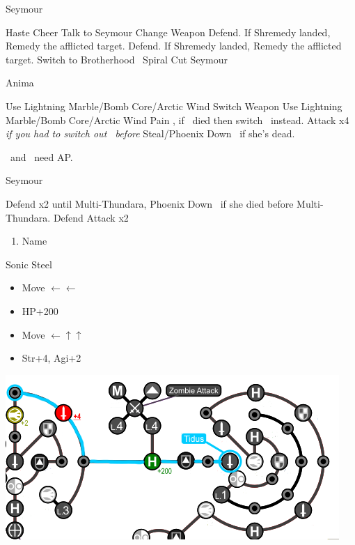 \begin{battle}[3000]{Seymour}
	\begin{itemize}
		\tidusf Haste \tidus
		\tidusf Cheer
		\tidusf Talk to Seymour
		\yunaf Change Weapon
		\switch{\kimahri}{\rikku}
		\rikkuf Defend. If Shremedy landed, Remedy the afflicted target.
		\switch{\yuna}{\kimahri}
		\kimahrif Defend. If Shremedy landed, Remedy the afflicted target.
		\tidusf Switch to Brotherhood
		\tidusf \od\ Spiral Cut Seymour
	\end{itemize}
\end{battle}
\vfill
\begin{battle}[18000]{Anima}
	\begin{itemize}
		\rikkuf Use Lightning Marble/Bomb Core/Arctic Wind
		\switch{\tidus}{\wakka}
		\wakkaf Switch Weapon
		\kimahrif Use Lightning Marble/Bomb Core/Arctic Wind
		\enemyf Pain
		\switch{\wakka}{\tidus}, if \wakka\ died then switch \rikku\ instead.
		\tidusf Attack x4
		\switch{\kimahri}{\rikku} \textit{if you had to switch out \rikku\ before}
		\rikkuf Steal/Phoenix Down \yuna\ if she's dead.
	\end{itemize}
	\tidus\ and \yuna\ need AP.
\end{battle}
\begin{battle}[6000]{Seymour}
	\begin{itemize}
		\tidusf Defend x2 until Multi-Thundara, Phoenix Down \rikku\ if she died before Multi-Thundara.
	      \rikkuf Defend
	      \tidusf Attack x2
	\end{itemize}
\end{battle}
\begin{enumerate}[resume]
	\item Name \shiva
\end{enumerate}
\begin{equip}
	\begin{itemize}
		\tidusf Sonic Steel
	\end{itemize}
\end{equip}
\begin{spheregrid}
	\begin{itemize}
		\tidusf
		\begin{itemize}
			\item Move $\leftarrow\leftarrow$
			\item HP+200
			\item Move $\leftarrow\uparrow\uparrow$
			\item Str+4, Agi+2
		\end{itemize}
		\includegraphics[width=.8\columnwidth]{graphics/Tidus_Post_Seymour}
	\end{itemize}
\end{spheregrid}
